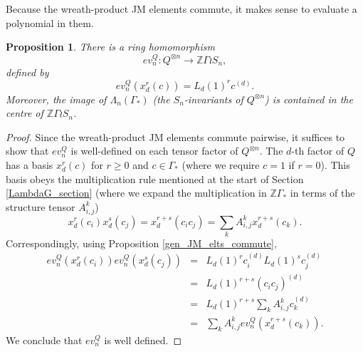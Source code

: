 \documentclass[10pt]{article}
\newtheorem{proposition}[theorem]{Proposition}
\theoremstyle{definition}
\begin{document}
Because the wreath-product JM elements commute, it makes sense to evaluate a polynomial in them.
\begin{proposition}
There is a ring homomorphism
\[
ev_n^Q: Q^{\otimes n} \to \mathbb{Z} \Gamma \wr S_n,
\]
defined by 
\[
ev_n^Q(x_d^r(c)) = L_d(1)^r c^{(d)}.
\]
Moreover, the image of $\Lambda_n(\Gamma_*)$ \textup{(}the $S_n$-invariants of $Q^{\otimes n}$\textup{)} is contained in the centre of $\mathbb{Z} \Gamma \wr S_n$.
\end{proposition}
\begin{proof}
Since the wreath-product JM elements commute pairwise, it suffices to show that $ev_n^Q$ is well-defined on each tensor factor of $Q^{\otimes n}$. The $d$-th factor of $Q$ has a basis $x_d^r(c)$ for $r \geq 0$ and $c \in \Gamma_*$ (where we require $c=1$ if $r=0$). This basis obeys the multiplication rule mentioned at the start of Section \ref{LambdaG_section} (where we expand the multiplication in $\mathbb{Z}\Gamma_*$ in terms of the structure tensor $A_{i,j}^k$)
\[
x_d^r(c_i) x_d^s(c_j) = x_d^{r+s}(c_ic_j) = \sum_k A_{i,j}^k x_d^{r+s}(c_k).
\]
Correspondingly, using Proposition \ref{gen_JM_elts_commute},
\begin{eqnarray*}
ev_n^Q(x_d^r(c_i))ev_n^Q(x_d^s(c_j)) &=& L_d(1)^r c_i^{(d)} L_d(1)^s c_j^{(d)} \\
&=& L_d(1)^{r+s} (c_ic_j)^{(d)} \\
&=& L_d(1)^{r+s} \sum_k A_{i,j}^k c_k^{(d)} \\
&=& \sum_k A_{i,j}^k ev_n^Q(x_d^{r+s}(c_k)).
\end{eqnarray*}
We conclude that $ev_n^Q$ is well defined. 


\end{proof}
\end{document}
